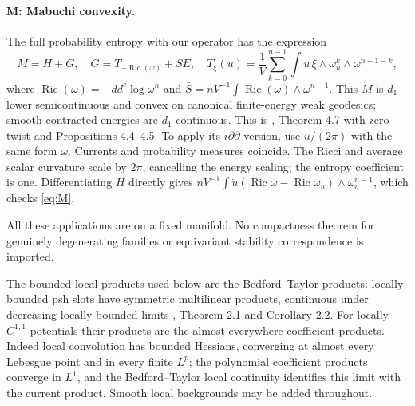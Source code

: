 \documentclass[11pt]{article}
\newcommand{\Ric}{\operatorname{Ric}}
\newcommand{\ddc}{dd^c}
\theoremstyle{remark}\newtheorem{remark}[theorem]{Remark}
\begin{document}
\paragraph{M: Mabuchi convexity.}
The full probability entropy with our operator has the expression
\begin{equation}\label{eq:M}
 M=H+G,\quad G=T_{-\Ric(\omega)}+\bar S E,\quad
 T_\xi(u)=\frac1V\sum_{k=0}^{n-1}
 \int u\,\xi\wedge\omega_u^k\wedge\omega^{n-1-k},
\end{equation}
where $\Ric(\omega)=-\ddc\log\omega^n$ and
$\bar S=nV^{-1}\int\Ric(\omega)\wedge\omega^{n-1}$.
This $M$ is $d_1$ lower semicontinuous and convex on canonical
finite-energy weak geodesics; smooth contracted energies are $d_1$
continuous. This is \cite{BDL}, Theorem 4.7 with zero twist and
Propositions 4.4--4.5. To apply its $i\partial\bar\partial$ version,
use $u/(2\pi)$ with the same form $\omega$. Currents and probability
measures coincide. The Ricci and average scalar curvature scale by
$2\pi$, cancelling the energy scaling; the entropy coefficient is
one. Differentiating $H$ directly gives
$nV^{-1}\int\dot u(\Ric\omega-\Ric\omega_u)\wedge\omega_u^{n-1}$,
which checks \eqref{eq:M}.

All these applications are on a fixed manifold. No compactness
theorem for genuinely degenerating families or equivariant stability
correspondence is imported.

The bounded local products used below are the Bedford--Taylor
products: locally bounded psh slots have symmetric multilinear
products, continuous under decreasing locally bounded limits
\cite{BT}, Theorem 2.1 and Corollary 2.2. For locally $C^{1,1}$
potentials their products are the almost-everywhere coefficient
products. Indeed local convolution has bounded Hessians, converging
at almost every Lebesgue point and in every finite $L^p$; the
polynomial coefficient products converge in $L^1$, and the
Bedford--Taylor local continuity identifies this limit with the
current product. Smooth local backgrounds may be added throughout.
\end{document}
